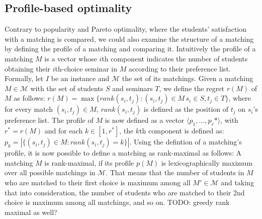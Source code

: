 \subsection{Profile-based optimality}
Contrary to popularity and Pareto optimality, where the students' satisfaction with a matching is compared, we could also examine the structure of a matching by defining the profile of a matching and comparing it. Intuitively the profile of a matching $M$ is a vector whose $i$th component indicates the number of students obtaining their $i$th-choice seminar in $M$ according to their preference list. 
\newline
Formally, let $I$ be an instance and $\mathcal{M}$ the set of its matchings. Given a matching $M \in \mathcal{M}$ with the set of students $S$ and seminars $T$, we define the regret $r(M)$ of $M$ as follows:
$r(M) = \max \{rank(s_i, t_j): (s_i, t_j)\in M\, s_i \in S, t_j \in T\}$, where for every match $(s_i, t_j) \in M$, $rank(s_i, t_j)$ is defined as the position of $t_j$ on $s_i$'s preference list. The profile of $M$ is now defined as a vector $\langle p_1,..., p_r* \rangle$, with $r^* = r(M)$ and for each $k \in [1,r^*]$, the $k$th component is defined as: $p_k=|\{(s_i, t_j) \in M: rank(s_i, t_j) = k\}|$.\cite{algorithmics}
\newline
Using the defintion of a matching's profile, it is now possible to define a matching as rank-maximal as follows: A matching $M$ is rank-maximal, if its profile $p(M)$ is lexicographically maximum over all possible matchings in $\mathcal{M}$. That means that the number of students in $M$ who are matched to their first choice is maximum among all $M' \in \mathcal{M}$ and taking that into consideration, the number of students who are matched to their 2nd choice is maximum among all matchings, and so on.
TODO: greedy rank maximal as well? 

